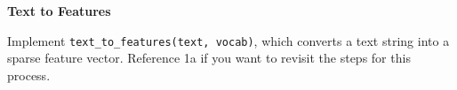 \item {} \textbf{Text to Features}

Implement \texttt{text\_to\_features(text, vocab)}, which converts a text string into a sparse feature vector.
Reference 1a if you want to revisit the steps for this process.